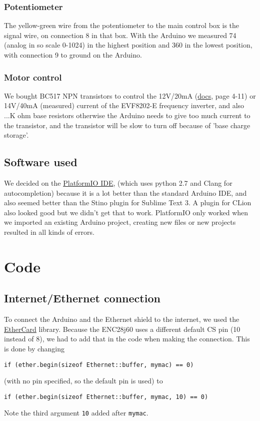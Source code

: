 \documentclass{article}
\begin{document}
	\subsubsection{Potentiometer}
	The yellow-green wire from the potentiometer to the main control box is the signal wire, on connection 8 in that box. With the Arduino we measured 74 (analog in so scale 0-1024) in the highest position and 360 in the lowest position, with connection 9 to ground on the Arduino.
	\subsubsection{Motor control}
	We bought BC517 NPN transistors to control the 12V/20mA (\href{http://download.lenze.com/TD/8201-8204__Inverter__v02-08__EN.pdf }{docs}, page 4-11) or 14V/40mA (measured) current of the EVF8202-E frequency inverter, and also ...K ohm base resistors otherwise the Arduino needs to give too much current to the transistor, and the transistor will be slow to turn off because of 'base charge storage'.

	\subsection{Software used}
	We decided on the \href{http://platformio.org/platformio-ide}{PlatformIO IDE}, (which uses python 2.7 and Clang for autocompletion) because it is a lot better than the standard Arduino IDE, and also seemed better than the Stino plugin for Sublime Text 3. A plugin for CLion also looked good but we didn't get that to work. PlatformIO only worked when we imported an existing Arduino project, creating new files or new projects resulted in all kinds of errors.
	
	\section{Code}
		\subsection{Internet/Ethernet connection}
			To connect the Arduino and the Ethernet shield to the internet, we used the \href{https://github.com/jcw/ethercard}{EtherCard} library. Because the ENC28j60 uses a different default CS pin (10 instead of 8), we had to add that in the code when making the connection. This is done by changing
			\begin{lstlisting}
if (ether.begin(sizeof Ethernet::buffer, mymac) == 0)
			\end{lstlisting}
			(with no pin specified, so the default pin is used) to
			\begin{lstlisting}
if (ether.begin(sizeof Ethernet::buffer, mymac, 10) == 0)
			\end{lstlisting}
			Note the third argument \lstinline|10| added after \lstinline|mymac|.

	
	
\end{document}
